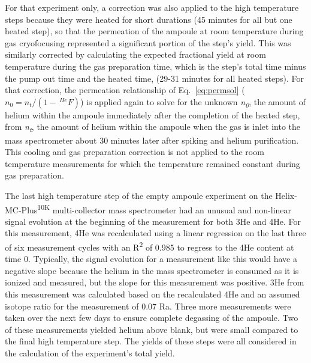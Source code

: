 For that experiment only, a correction was also applied to the high temperature steps because they were heated for short durations (45 minutes for all but one heated step), so that the permeation of the ampoule at room temperature during gas cryofocusing represented a significant portion of the step's yield. This was similarly corrected by calculating the expected fractional yield at room temperature during the gas preparation time, which is the step's total time minus the pump out time and the heated time, (29-31 minutes for all heated steps). For that correction, the permeation relationship of Eq.~\eqref{eq:permsol} (\(n_{0} = n_{t}/(1 - \,^{He}F)\)) is applied again to solve for the unknown \emph{n\textsubscript{0}}, the amount of helium within the ampoule immediately after the completion of the heated step, from \emph{n\textsubscript{t}}, the amount of helium within the ampoule when the gas is inlet into the mass spectrometer about 30 minutes later after spiking and helium purification. This cooling and gas preparation correction is not applied to the room temperature measurements for which the temperature remained constant during gas preparation.

The last high temperature step of the empty ampoule experiment on the Helix-MC-Plus\textsuperscript{10K} multi-collector mass spectrometer had an unusual and non-linear signal evolution at the beginning of the measurement for both 3He and 4He. For this measurement, 4He was recalculated using a linear regression on the last three of six measurement cycles with an R\textsuperscript{2} of 0.985 to regress to the 4He content at time 0. Typically, the signal evolution for a measurement like this would have a negative slope because the helium in the mass spectrometer is consumed as it is ionized and measured, but the slope for this measurement was positive. 3He from this measurement was calculated based on the recalculated 4He and an assumed isotope ratio for the measurement of 0.07 Ra. Three more measurements were taken over the next few days to ensure complete degassing of the ampoule. Two of these measurements yielded helium above blank, but were small compared to the final high temperature step. The yields of these steps were all considered in the calculation of the experiment's total yield.

